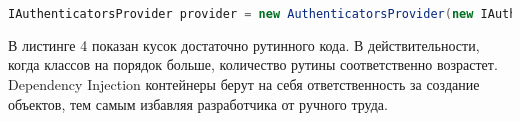 \begin{lstlisting}[language=Java,caption={Место получения (в данном случае создания) экземпляра класса AuthenticatorsProvider}]
IAuthenticatorsProvider provider = new AuthenticatorsProvider(new IAuthenticator[]{new LocalAuthenticator(), new FacebookAuthenticator(), new GmailAuthenticator()});
\end{lstlisting}

В листинге 4 показан кусок достаточно рутинного кода. В действительности, когда классов на порядок больше, количество рутины соответственно возрастет.
Dependency Injection контейнеры берут на себя ответственность за создание объектов, тем самым избавляя разработчика от ручного труда.